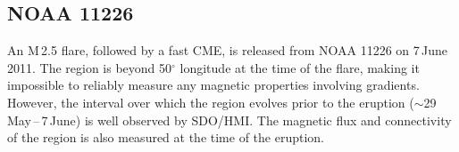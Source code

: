 {%

\subsection{NOAA 11226}\label{sect:noaa_11226}

An M\,2.5 flare, followed by a fast \gls{CME}, is released from NOAA 11226 on 7\,June\,2011. The region is beyond 50$^{\circ}$ longitude at the time of the flare, making it impossible to reliably measure any magnetic properties involving gradients. However, the interval over which the region evolves prior to the eruption ($\sim$29\,May\,--\,7\,June) is well observed by SDO/HMI. The magnetic flux and connectivity of the region is also measured at the time of the eruption.  
 
}
